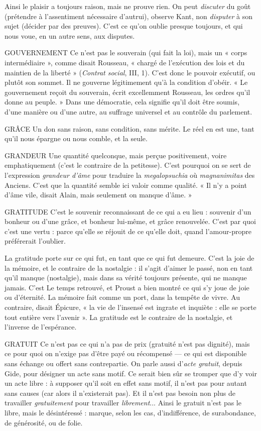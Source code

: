 Ainsi le plaisir a toujours raison, mais ne prouve rien. On peut {\it discuter} du
goût (prétendre à l’assentiment nécessaire d’autrui), observe Kant, non {\it disputer}
à son sujet (décider par des preuves). C’est ce qu’on oublie presque toujours, et
qui nous voue, en un autre sens, aux disputes.

GOUVERNEMENT Ce n'est pas le souverain (qui fait la loi), mais un
« corps intermédiaire », comme disait Rousseau, « chargé
de l'exécution des lois et du maintien de la liberté » ({\it Contrat social}, III, 1). C’est
donc le pouvoir exécutif, ou plutôt son sommet. Il ne gouverne légitimement
qu’à la condition d’obéir. « Le gouvernement reçoit du souverain, écrit excellemment
Rousseau, les ordres qu’il donne au peuple. » Dans une démocratie,
cela signifie qu’il doit être soumis, d’une manière ou d’une autre, au suffrage
universel et au contrôle du parlement.

GRÂCE Un don sans raison, sans condition, sans mérite. Le réel en est une,
tant qu’il nous épargne ou nous comble, et la seule.

GRANDEUR Une quantité quelconque, mais perçue positivement, voire
emphatiquement (c’est le contraire de la petitesse). C’est
pourquoi on se sert de l’expression {\it grandeur d'âme} pour traduire la {\it megalopsuchia}
où {\it magnanimitas} des Anciens. C’est que la quantité semble ici valoir
comme qualité. « Il n’y a point d'âme vile, disait Alain, mais seulement on
manque d'âme. »

GRATITUDE C'est le souvenir reconnaissant de ce qui a eu lieu : souvenir
d’un bonheur ou d’une grâce, et bonheur lui-même, et grâce
renouvelée. C’est par quoi c’est une vertu : parce qu’elle se réjouit de ce qu’elle
doit, quand l’amour-propre préférerait l'oublier.

La gratitude porte sur ce qui fut, en tant que ce qui fut demeure. C’est la
joie de la mémoire, et le contraire de la nostalgie : il s’agit d’aimer le passé, non
en tant qu’il manque (nostalgie), mais dans sa vérité toujours présente, qui ne
manque jamais. C’est Le temps retrouvé, et Proust a bien montré ce qui s’y joue
de joie ou d’éternité. La mémoire fait comme un port, dans la tempête de vivre.
Au contraire, disait Épicure, « la vie de l’insensé est ingrate et inquiète : elle se
porte tout entière vers l'avenir ». La gratitude est le contraire de la nostalgie, et
l'inverse de l’espérance.

GRATUIT Ce n’est pas ce qui n’a pas de prix (gratuité n’est pas dignité),
mais ce pour quoi on n’exige pas d’être payé ou récompensé — ce
qui est disponible sans échange ou offert sans contrepartie. On parle aussi
d’{\it acte gratuit}, depuis Gide, pour désigner un acte sans motif. Ce serait bien sûr
se tromper que d’y voir un acte libre : à supposer qu’il soit en effet sans motif,
il n’est pas pour autant sans causes (car alors il n’existerait pas). Et il n’est pas
besoin non plus de travailler {\it gratuitement} pour travailler {\it librement}... Ainsi le
gratuit n’est pas le libre, mais le désintéressé : marque, selon les cas, d’indifférence,
de surabondance, de générosité, ou de folie.

